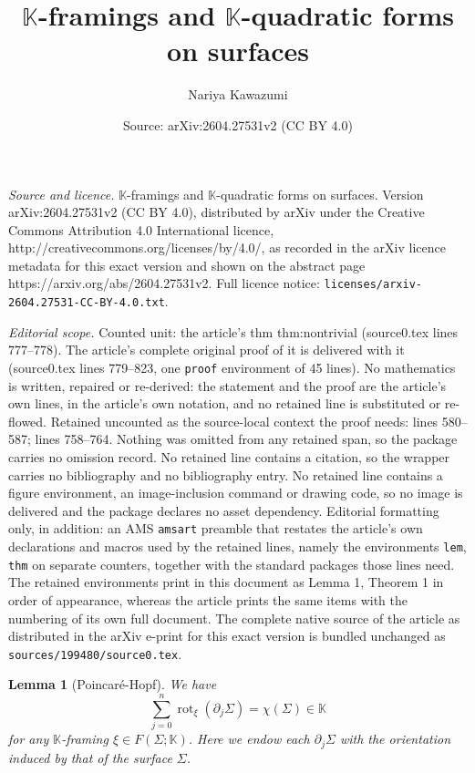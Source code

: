 \documentclass[10pt,a4paper]{amsart}
\title{$\mathbb{K}$-framings and $\mathbb{K}$-quadratic forms on surfaces}
\author{Nariya Kawazumi}
\date{Source: arXiv:2604.27531v2 (CC BY 4.0)}
\newtheorem{lem}{Lemma}
\newcommand\bK{{\mathbb{K}}}
\newcommand\pa{\partial}
\newcommand\rot{\operatorname{rot}}
\begin{document}
\maketitle

\noindent\emph{Source and licence.} $\mathbb{K}$-framings and $\mathbb{K}$-quadratic forms on surfaces. Version arXiv:2604.27531v2 (CC BY 4.0), distributed by arXiv under the Creative Commons Attribution 4.0 International licence, http://creativecommons.org/licenses/by/4.0/, as recorded in the arXiv licence metadata for this exact version and shown on the abstract page https://arxiv.org/abs/2604.27531v2. Full licence notice: \texttt{licenses/arxiv-2604.27531-CC-BY-4.0.txt}.\par\smallskip

\noindent\textit{Editorial scope.} Counted unit: the article's thm thm:nontrivial (source0.tex lines 777--778). The article's complete original proof of it is delivered with it (source0.tex lines 779--823, one \texttt{proof} environment of 45 lines). No mathematics is written, repaired or re-derived: the statement and the proof are the article's own lines, in the article's own notation, and no retained line is substituted or re-flowed.  Retained uncounted as the source-local context the proof needs: lines 580--587; lines 758--764.  Nothing was omitted from any retained span, so the package carries no omission record.  No retained line contains a citation, so the wrapper carries no bibliography and no bibliography entry.  No retained line contains a figure environment, an image-inclusion command or drawing code, so no image is delivered and the package declares no asset dependency.  Editorial formatting only, in addition: an AMS \texttt{amsart} preamble that restates the article's own declarations and macros used by the retained lines, namely the environments \texttt{lem}, \texttt{thm} on separate counters, together with the standard packages those lines need.  The retained environments print in this document as Lemma 1, Theorem 1 in order of appearance, whereas the article prints the same items with the numbering of its own full document.  The complete native source of the article as distributed in the arXiv e-print for this exact version is bundled unchanged as \texttt{sources/199480/source0.tex}.
\begin{lem}[Poincar\'e-Hopf]\label{lem:PH}
We have 
\begin{equation}\label{eq:PH}
{\sum}^n_{j=0}\rot_\xi(\pa_j\Sigma) = \chi(\Sigma) \in \bK
\end{equation}
for any $\bK$-framing $\xi \in F(\Sigma; \bK)$. 
Here we endow each $\pa_j\Sigma$ with the orientation induced by that of the surface $\Sigma$.
\end{lem}
\end{document}

